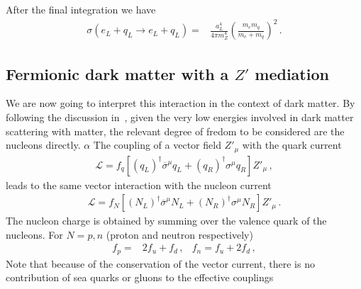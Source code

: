 After the final integration we have
\begin{align}
  \label{eq:csdm}
       \sigma(e_L+q_L\to e_L+q_L)
                    =&\frac{a_L^4}{4\pi m_Z^4}\left( \frac{m_em_q}{m_e+m_q} \right)^2\,.
\end{align}


\subsection{Fermionic dark matter with a $Z'$ mediation}
We are now going  to interpret this interaction in the context of dark matter. By following the discussion in~\cite{Cirelli:2013ufw}, given the very low energies involved in dark matter scattering with matter, the relevant degree of fredom to be considered are the nucleons directly.
$\alpha$
The coupling of a vector field ${Z'}_{\mu}$ with the quark current
\begin{align*}
  \mathcal{L}=f_{q}\left[ \left( q_L \right)^{\dagger}\overline{\sigma}^{\mu}q_L+\left( q_R \right)^{\dagger}{\sigma}^{\mu}q_R \right] Z'_{\mu}\,,
\end{align*}
leads to the same vector interaction with the nucleon current
\begin{align*}
  \mathcal{L}=f_{N} \left[\left( N_L \right)^{\dagger}\overline{\sigma}^{\mu}N_L
  +\left( N_R \right)^{\dagger}{\sigma}^{\mu}N_R \right] Z'_{\mu}\,.
\end{align*}
The nucleon charge is obtained by summing over the valence quark of the nucleons. For $N=p,n$ (proton and neutron respectively)
\begin{align}
  \label{eq:fpfn}
  f_p=&2f_u+f_d\,,& f_n=f_u+2f_d\,,
\end{align}
Note that because of the conservation of the vector current, there is no contribution of
sea quarks or gluons to the effective couplings~\cite{Frandsen:2011cg}


